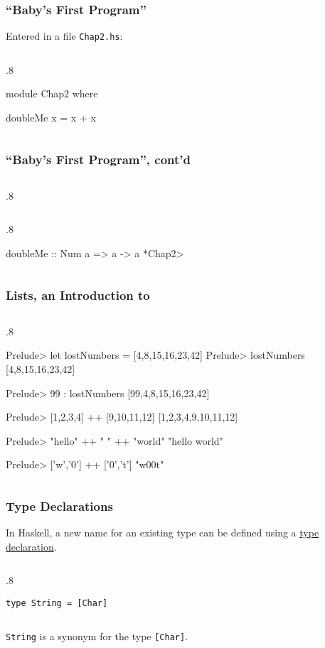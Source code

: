 \documentclass{beamer}
\newenvironment{codeblock}[1][.8]{%
\begin{columns}
\begin{column}{#1\linewidth}
\begin{exampleblock}{}}{%
\end{exampleblock}
\end{column}
\end{columns}}
\def\slideskip{\vskip 0.1in}
\begin{document}
\begin{frame}[fragile]
\frametitle{``Baby's First Program''}

Entered in a file \verb+Chap2.hs+:
\begin{codeblock}
\begin{hcode}
module Chap2 where

doubleMe x = x + x  
\end{hcode}
\end{codeblock}

\end{frame}

\begin{frame}[fragile]
\frametitle{``Baby's First Program'', cont'd}
\begin{codeblock}
\end{codeblock}
\pause
\begin{codeblock}
\begin{hcode}
doubleMe :: Num a => a -> a
*Chap2> 
\end{hcode}
\end{codeblock}
\end{frame}


\begin{frame}[fragile]
\frametitle{Lists, an Introduction to}
\begin{codeblock}
\begin{hcode}
Prelude> let lostNumbers = [4,8,15,16,23,42] 
Prelude> lostNumbers
[4,8,15,16,23,42]

Prelude> 99 : lostNumbers
[99,4,8,15,16,23,42]

Prelude> [1,2,3,4] ++ [9,10,11,12]
[1,2,3,4,9,10,11,12]

Prelude> "hello" ++ " " ++ "world"
"hello world"

Prelude> ['w','0'] ++ ['0','t']
"w00t"
\end{hcode}
\end{codeblock}
\end{frame}

\begin{frame}[fragile]
\Large

\frametitle{Type Declarations}

In Haskell, a new name for an existing type can be 
defined using a \underline{type declaration}. 

\slideskip

\begin{codeblock}
\begin{verbatim}
type String = [Char] 
\end{verbatim}
\end{codeblock}

\slideskip

{\tt String} is a synonym for the type \verb+[Char]+.
\end{frame}
\end{document}
